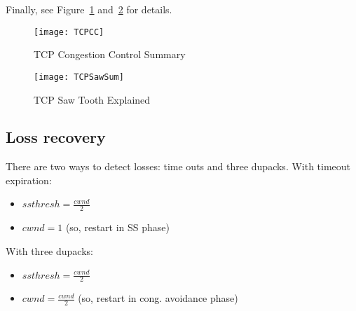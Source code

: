 Finally, see Figure~\ref{fig:tcp:TCPCC} and~\ref{fig:tcp:TCPSawSum} for details.
	
\begin{figure}[t]
  \centering
  \texttt{[image: TCPCC]}
  \caption{TCP Congestion Control Summary}
  \label{fig:tcp:TCPCC}
\end{figure}

\begin{figure}[t]
  \centering
  \texttt{[image: TCPSawSum]}
  \caption{TCP Saw Tooth Explained}
  \label{fig:tcp:TCPSawSum}
\end{figure}

\subsection{Loss recovery}
There are two ways to detect losses: time outs and three dupacks.
With timeout expiration:
\begin{itemize}
  \item $ssthresh = \frac{cwnd}{2}$
  \item $cwnd = 1$ (so, restart in SS phase)
\end{itemize}
With three dupacks:
\begin{itemize}
  \item $ssthresh = \frac{cwnd}{2}$
  \item $cwnd = \frac{cwnd}{2}$ (so, restart in cong. avoidance phase)
\end{itemize}
